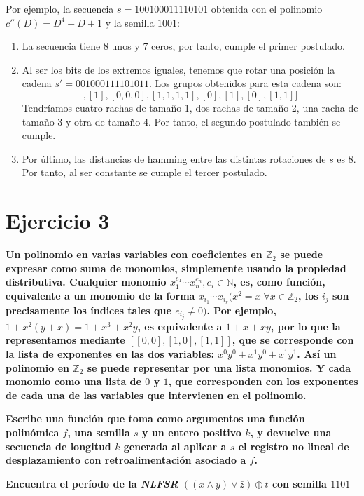 \documentclass[10pt,spanish]{article}
\begin{document}
Por ejemplo, la secuencia $s=100100011110101$ obtenida con el polinomio $c''(D) = D^4 + D + 1$ y la semilla $1001$:
\begin{enumerate}[---]
    \item La secuencia tiene 8 unos y 7 ceros, por tanto, cumple el primer postulado.
    \item Al ser los bits de los extremos iguales, tenemos que rotar una posición la cadena $s' = 001000111101011$. Los grupos obtenidos para esta cadena son:
    \begin{displaymath}
        [[0,0],[1],[0,0,0],[1,1,1,1],[0],[1],[0],[1,1]]
    \end{displaymath}
    Tendríamos cuatro rachas de tamaño 1, dos rachas de tamaño 2, una racha de tamaño 3 y otra de tamaño 4. Por tanto, el segundo postulado también se cumple.
    \item Por último, las distancias de hamming entre las distintas rotaciones de $s$ es 8. Por tanto, al ser constante se cumple el tercer postulado.
\end{enumerate}

\section{\textcolor{azul}Ejercicio 3}
\textbf{Un polinomio en varias variables con coeficientes en $\mathbb{Z}_2$ se puede expresar como suma de monomios,  simplemente  usando  la  propiedad  distributiva.   Cualquier  monomio $x_1^{e_1} \cdots x_n^{e_n} , e_i \in \mathbb{N}$, es, como función, equivalente a un monomio de la forma $x_{i_1} \cdots x_{i_r} (x^2=x \; \forall x \in \mathbb{Z}_2$, los $i_j$ son precisamente los índices tales que $e_{i_j} \neq 0)$.  Por ejemplo,  $1 + x^2 (y + x) = 1 + x^3 + x^2 y$, es equivalente a $1 + x + xy$, por lo que la representamos mediante $[[0, 0], [1, 0], [1, 1]]$, que se corresponde con la lista de exponentes en las dos variables: $x^0 y^0 + x^1 y^0 + x^1 y^1$.  Así un polinomio en $\mathbb{Z}_2$ se puede representar por una lista monomios.  Y cada monomio como una lista de $0$ y $1$, que corresponden con los exponentes de cada una de las variables que intervienen en el polinomio.}

\textbf{Escribe una función que toma como argumentos una  función polinómica $f$, una semilla $s$ y un entero positivo $k$, y devuelve una secuencia de longitud $k$ generada al aplicar a $s$ el registro no lineal de desplazamiento con retroalimentación asociado a $f$.}

\textbf{Encuentra el período de la \textit{\textcolor{azul}{NLFSR}} $((x \wedge y) \vee \bar{z}) \oplus t$ con semilla $1101$}
\end{document}
